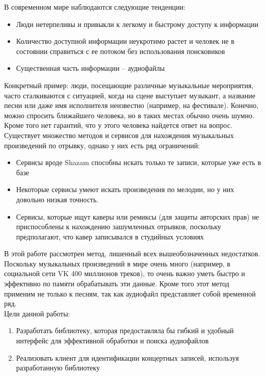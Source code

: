 \Introduction

В современном мире наблюдаются следующие тенденции:
\begin{itemize}
    \item Люди нетерпеливы и привыкли к легкому и быстрому доступу к информации
    \item Количество доступной информации неукротимо растет и человек не в состоянии
    справиться с ее потоком без использования поисковиков
    \item Существенная часть информации -- аудиофайлы
\end{itemize}

Конкретный пример: люди, посещающие различные музыкальные мероприятия, часто сталкиваются
с ситуацией, когда на сцене выступает музыкант, а название песни
или даже имя исполнителя неизвестно (например, на фестивале).
Конечно, можно спросить ближайшего человека, но в таких местах обычно очень шумно.
Кроме того нет гарантий, что у этого человека найдется ответ на вопрос.
Существует множество методов и сервисов для нахождения музыкальных произведений по отрывку,
однако у них есть ряд ограничений:
\begin{itemize}
    \item Сервисы вроде Shazam способны искать только те записи, которые уже есть в базе
    \item Некоторые сервисы умеют искать произведения по мелодии, но у них
            довольно низкая точность.
    \item Сервисы, которые ищут каверы или ремиксы (для защиты авторских прав) не приспособлены
            к нахождению зашумленных отрывков, поскольку предполагают, что кавер записывался в
            студийных условиях
\end{itemize}
В этой работе рассмотрен метод, лишенный всех вышеобозначенных недостатков.
Поскольку музыкальных произведений в мире очень много (например, в социальной сети VK 400 миллионов треков),
то очень важно уметь быстро и эффективно по памяти обрабатывать эти данные.
Кроме того этот метод применим не только к песням, так как аудиофайл представляет собой временной ряд.\\
Цели данной работы:
\begin{enumerate}[label=\arabic*.]
    \item Разработать библиотеку, которая предоставляла бы гибкий и удобный интерфейс
            для эффективной обработки и поиска аудиофайлов
    \item Реализовать клиент для идентификации концертных записей, используя разработанную
    библиотеку
\end{enumerate}
